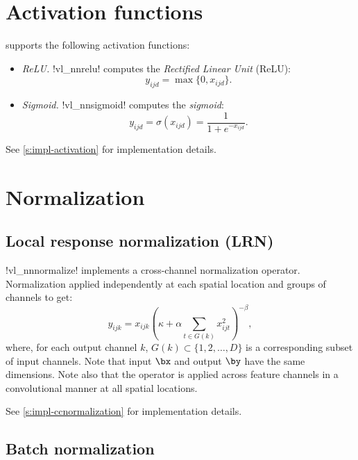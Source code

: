 \section{Activation functions}\label{s:activation}

\matconvnet supports the following activation functions:
%
\begin{itemize}
\item \emph{ReLU.} !vl_nnrelu! computes the \emph{Rectified Linear Unit} (ReLU):
\[
 y_{ijd} = \max\{0, x_{ijd}\}.
\]

\item \emph{Sigmoid.} !vl_nnsigmoid! computes the \emph{sigmoid}:
\[
 y_{ijd} = \sigma(x_{ijd}) = \frac{1}{1+e^{-x_{ijd}}}.
\]
\end{itemize}
%
See \autoref{s:impl-activation} for implementation details.

\section{Normalization}\label{s:normalization}

\subsection{Local response normalization (LRN)}\label{s:ccnormalization}

!vl_nnnormalize! implements a cross-channel normalization operator. Normalization applied independently at each spatial location and groups of channels to get:
\[
 y_{ijk} = x_{ijk} \left( \kappa + \alpha \sum_{t\in G(k)} x_{ijt}^2 \right)^{-\beta},
\]
where, for each output channel $k$, $G(k) \subset \{1, 2, \dots, D\}$ is a corresponding subset of input channels. Note that input $\bx$ and output $\by$ have the same dimensions. Note also that the operator is applied across feature channels in a convolutional manner at all spatial locations.

See \autoref{s:impl-ccnormalization} for implementation details.

\subsection{Batch normalization}\label{s:bnorm}


